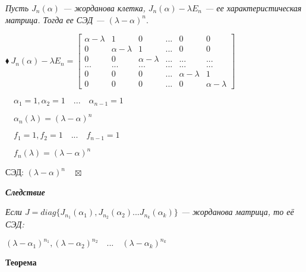 \documentclass[a4paper, 12pt]{report}
\begin{document}
	\textit{Пусть $J_n(\alpha)$ --- жорданова клетка, $J_n(\alpha) - \lambda E_n$ --- ее характеристическая матрица. Тогда ее СЭД --- $(\lambda - \alpha)^n$}.
	\par\bigskip
	$\blacklozenge\ J_n(\alpha) - \lambda E_n = \begin{bmatrix} \alpha - \lambda & 1 & 0 & ... & 0 & 0 \\ 0 & \alpha - \lambda & 1 & ... & 0 & 0 \\ 0 & 0 & \alpha - \lambda & ... & ... & ... \\ ... & ... & ... & ... & ... & ...\\ 0 & 0 & 0 & ... & \alpha - \lambda & 1 \\ 0 & 0 & 0 & ... & 0 & \alpha - \lambda \end{bmatrix}$
	\par\bigskip
	$\quad \alpha_1 = 1, \alpha_2 = 1 \quad ... \quad \alpha_{n-1} = 1$
	\par\bigskip
	$\quad \alpha_n(\lambda) = (\lambda - \alpha)^n$
	\par\bigskip
	$\quad f_1 = 1, f_2 = 1 \quad ... \quad  f_{n-1} = 1$
	\par\bigskip
	$\quad f_n(\lambda) = (\lambda - \alpha)^n$
	\par\bigskip
	\quad СЭД: $(\lambda - \alpha)^n \quad \boxtimes$
	\par\bigskip
	\textit{\textbf{Следствие}}
	
	\textit{Если $J = diag\{J_{n_1}(\alpha_1), J_{n_2}(\alpha_2) ... J_{n_k}(\alpha_k)\}$ --- жорданова матрица, то её СЭД: }
	
	$(\lambda - \alpha_1)^{n_1}, (\lambda - \alpha_2)^{n_2} \quad ... \quad (\lambda - \alpha_k)^{n_k} $
	\par\bigskip
	\textbf{Теорема}
	
\end{document}
